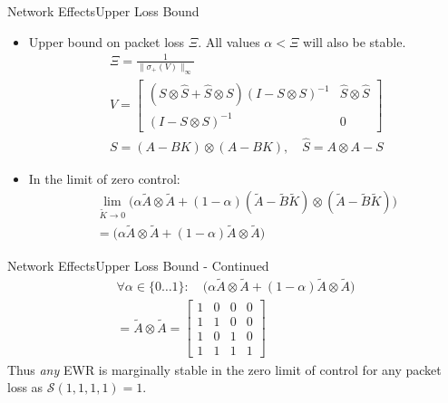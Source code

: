 \begin{frame}{Network Effects}{Upper Loss Bound}
	\begin{itemize}
		\item Upper bound on packet loss $ \Xi $. All values $\alpha < \Xi$ will also be stable.
		\begin{equation}\label{eq:VMatrix}
			\begin{gathered}
				\Xi = \frac{1}{\lVert\sigma_+(V)\rVert_\infty} \\
				V = \begin{bmatrix} (S\otimes\hat{S}+\hat{S} \otimes S)(I - S\otimes S)^{-1} & \hat{S}\otimes\hat{S} \\ (I - S\otimes S)^{-1} & 0 \end{bmatrix} \\
				S = \left(A-BK\right) \otimes \left(A-BK\right), \quad \hat{S} = A \otimes A - S
			\end{gathered}
		\end{equation}
		\item In the limit of zero control:
		\begin{equation}
			\begin{split}
				\lim_{\tilde{K}\rightarrow 0} \Big(\alpha \tilde{A} \otimes \tilde{A} + (1-\alpha)(\tilde{A}-\tilde{B}\tilde{K}) \otimes (\tilde{A}-\tilde{B}\tilde{K}) \Big) \\
				= \Big(\alpha \tilde{A} \otimes \tilde{A} + (1-\alpha)\tilde{A} \otimes \tilde{A}\Big)	
			\end{split}
		\end{equation}
	\end{itemize}
\end{frame}	

\begin{frame}{Network Effects}{Upper Loss Bound - Continued}
		\begin{equation}
			\begin{split}
				\forall \alpha \in \{0 \dots 1\}: \quad \Big(\alpha \tilde{A} \otimes \tilde{A} + (1-\alpha)\tilde{A} \otimes \tilde{A}\Big) \\
				= \tilde{A}\otimes\tilde{A} 
				= \begin{bmatrix}  
					1 & 0 & 0 & 0 \\
					1 & 1 & 0 & 0 \\
					1 & 0 & 1 & 0 \\
					1 & 1 & 1 & 1	
				\end{bmatrix}
			\end{split}
		\end{equation}
		Thus \textit{any} EWR is marginally stable in the zero limit of control for any packet loss as $\mathcal{S}({1, 1, 1, 1}) = 1 $.
\end{frame}

